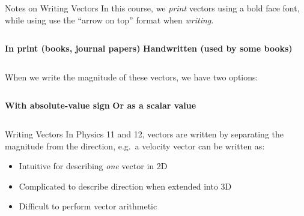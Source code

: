\documentclass[12pt,compress,aspectratio=169]{beamer}
\newcommand{\mb}[1]{\ensuremath\mathbf{#1}}
\newcommand{\eq}[2]{\vspace{#1}{\Large\begin{displaymath}#2\end{displaymath}}}
\begin{document}
\begin{frame}{Notes on  Writing Vectors}
  In this course, we \emph{print} vectors using a bold face font, while using
  use the ``arrow on top'' format when \emph{writing}.
  \vspace{.1in}
  \begin{columns}
    \textbf{In print (books, journal papers)}
    \textbf{Handwritten (used by some books)}
  \end{columns}

  When we write the magnitude of these vectors, we have two options:
  \vspace{.1in}
  \begin{columns}
    \textbf{With absolute-value sign}
    \textbf{Or as a scalar value}
      \vspace{-.2in}{\LARGE
        \begin{displaymath}
          v\quad F_g\quad p \quad I
        \end{displaymath}
      }
  \end{columns}
\end{frame}


\begin{frame}{Writing Vectors}
  In Physics 11 and 12, vectors are written by separating the magnitude from
  the direction, e.g.\ a velocity vector can be written as:
  
  \eq{-.1in}{
    \mb{v}=\SI{4.5}{m/s}\text{ [N \ang{55} E]}
  }

  \begin{itemize}
  \item Intuitive for describing \emph{one} vector in 2D
  \item Complicated to describe direction when extended into 3D
  \item Difficult to perform vector arithmetic
  \end{itemize}
\end{frame}
\end{document}
